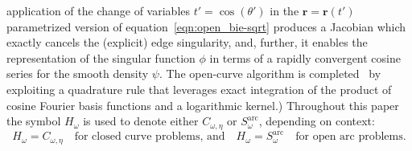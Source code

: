 \documentclass[11pt]{article}
\theoremstyle{plain}
\theoremstyle{remark}
\def \br{\mathbf{r}}
\begin{document}
application of the change of variables $t' = \cos(\theta')$ in the
$\br = \br(t')$ parametrized version of
equation~\eqref{eqn:open_bie-sqrt} produces a Jacobian which exactly
cancels the (explicit) edge singularity, and, further, it enables the
representation of the singular function $\phi$ in terms of a rapidly
convergent cosine series for the smooth density $\psi$. The open-curve
algorithm is completed~\cite{bruno2013high} by exploiting a quadrature
rule that leverages exact integration of the product of cosine Fourier
basis functions and a logarithmic kernel.)  Throughout this paper the
symbol $H_\omega$ is used to denote either $C_{\omega,\eta}$ or
$S^\mathrm{arc}_\omega$, depending on context:
\begin{equation}
  \label{eq:C_or_S}
  H_\omega = C_{\omega,\eta}\quad\mbox{for closed curve problems, and}\quad H_\omega = S^\mathrm{arc}_\omega\quad \mbox{for open arc problems.}
\end{equation}
\end{document}

